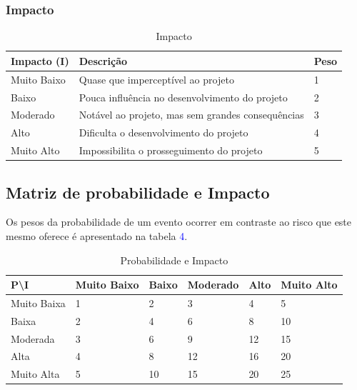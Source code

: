 \subsubsection{Impacto}

\begin{table}[ht]
\centering
\caption{Impacto}
\label{impacto}
\begin{tabular}{|l|l|l|}
\hline
\textbf{Impacto (I)} & \textbf{Descrição}                                & \textbf{Peso} \\  \hline
Muito Baixo          & Quase que imperceptível ao projeto                & 1             \\
Baixo                & Pouca influência no desenvolvimento do projeto    & 2             \\
Moderado             & Notável ao projeto, mas sem grandes consequências & 3             \\
Alto                 & Dificulta o desenvolvimento do projeto            & 4             \\ 
Muito Alto           & Impossibilita o prosseguimento do projeto         & 5             \\ 
\hline
\end{tabular}
\end{table}

\subsection{Matriz de probabilidade e Impacto}

	Os pesos da probabilidade de um evento ocorrer em contraste ao risco que este mesmo oferece é apresentado na tabela \textcolor{blue}{4}.  

\begin{table}[ht]
\centering
\caption{Probabilidade e Impacto}
\label{probabilidade-impacto}
\begin{tabular}{|l|l|l|l|l|l|}
\hline
P\textbackslash I  & Muito Baixo & Baixo & Moderado & Alto & Muito Alto \\ \hline
Muito Baixa                  & 1                               & 2                         & 3                   & 4               & 5                     \\ 
Baixa                    & 2                               & 4                         & 6                   & 8               & 10                    \\
Moderada                     & 3                               & 6                         & 9                   & 12              & 15                    \\ 
Alta                         & 4                               & 8                         & 12                  & 16              & 20                    \\ 
Muito Alta                   & 5                               & 10                        & 15                  & 20              & 25                    \\ 
\hline
\end{tabular}
\end{table}

